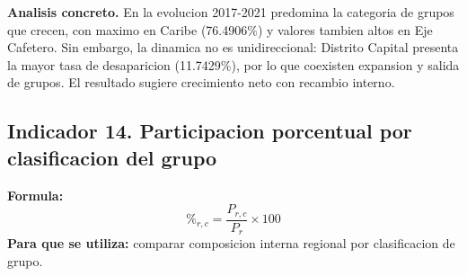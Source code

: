 \documentclass[12pt,letterpaper]{article}
\begin{document}
\textbf{Analisis concreto.} En la evolucion 2017-2021 predomina la categoria de grupos que crecen, con maximo en Caribe (76.4906\%) y valores tambien altos en Eje Cafetero. Sin embargo, la dinamica no es unidireccional: Distrito Capital presenta la mayor tasa de desaparicion (11.7429\%), por lo que coexisten expansion y salida de grupos. El resultado sugiere crecimiento neto con recambio interno.

\subsection{Indicador 14. Participacion porcentual por clasificacion del grupo}
\textbf{Formula:}
\[
\%_{r,c} = \frac{P_{r,c}}{P_r} \times 100
\]
\textbf{Para que se utiliza:} comparar composicion interna regional por clasificacion de grupo.

\small
\end{document}
